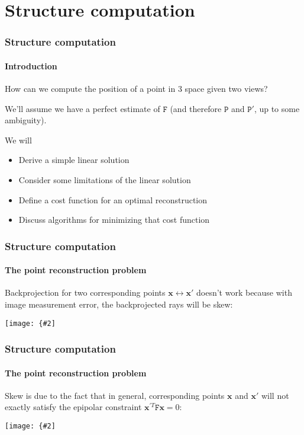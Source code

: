 \documentclass[aspectratio=169]{beamer}
\renewcommand{\vec}[1]{\boldsymbol{#1}}
\newcommand{\mat}[1]{\mathtt{#1}}
\newcommand{\myfig}[3]{\centerline{\texttt{[image: \{\#2]}}}
    \centerline{\scriptsize #3}}
\begin{document}
\section{Structure computation}

\begin{frame}
\frametitle{Structure computation}
\framesubtitle{Introduction}

How can we compute the \alert{position of a point in 3 space} given
two views?

\medskip

We'll assume we have a \alert{perfect} estimate of $\mat{F}$ (and
therefore $\mat{P}$ and $\mat{P}'$, up to some ambiguity).

\medskip

We will
\begin{itemize}
\item Derive a simple linear solution
\item Consider some limitations of the linear solution
\item Define a cost function for an optimal reconstruction
\item Discuss algorithms for minimizing that cost function
\end{itemize}

\end{frame}

\begin{frame}
\frametitle{Structure computation}
\framesubtitle{The point reconstruction problem}

Backprojection for two corresponding points $\vec{x} \leftrightarrow
\vec{x}'$ doesn't work because with image measurement error, the
backprojected rays will be \alert{skew}:

\medskip

\myfig{3in}{HZ-fig11-1a}{Hartley and Zisserman (2004), Fig.\ 12.1a}

\end{frame}

\begin{frame}
\frametitle{Structure computation}
\framesubtitle{The point reconstruction problem}

Skew is due to the fact that in general, corresponding points
$\vec{x}$ and $\vec{x}'$ will \alert{not exactly satisfy} the epipolar
constraint $\vec{x}^{\prime T}\mat{F}\vec{x}=0$:

\medskip

\myfig{4.5in}{HZ-fig11-1b}{Hartley and Zisserman (2004), Fig.\ 12.1b}

\end{frame}
\end{document}
